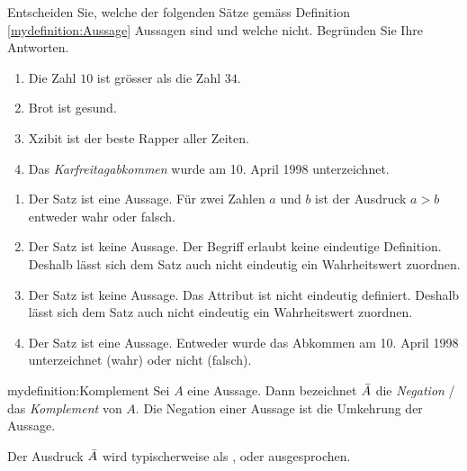 \clearpage
\begin{myexercise}%
	\noindent
	Entscheiden Sie, welche der folgenden Sätze gemäss Definition \cref{mydefinition:Aussage} Aussagen sind und welche nicht. Begründen Sie Ihre Antworten.
	\begin{enumerate}[label=(\alph*)]
		\item Die Zahl $10$ ist grösser als die Zahl $34$.
		\item Brot ist gesund.
		\item Xzibit ist der beste Rapper aller Zeiten.
		\item Das \textit{Karfreitagabkommen} wurde am 10. April 1998 unterzeichnet.
	\end{enumerate}
\end{myexercise}
\begin{myanswer}
	\noindent
	\begin{enumerate}[label=(\alph*)]
		\item Der Satz ist eine Aussage. Für zwei Zahlen $a$ und $b$ ist der Ausdruck $a > b$ entweder wahr oder falsch.
		\item Der Satz ist keine Aussage. Der Begriff  erlaubt keine eindeutige Definition. Deshalb lässt sich dem Satz auch nicht eindeutig ein Wahrheitswert zuordnen.
		\item Der Satz ist keine Aussage. Das Attribut  ist nicht eindeutig definiert. Deshalb lässt sich dem Satz auch nicht eindeutig ein Wahrheitswert zuordnen.
		\item Der Satz ist eine Aussage. Entweder wurde das Abkommen am 10. April 1998 unterzeichnet (wahr) oder nicht (falsch).
	\end{enumerate}
\end{myanswer}
\noindent
\begin{mydefinition}[Negation]{mydefinition:Komplement}
Sei $A$ eine Aussage. Dann bezeichnet $\Bar{A}$ die \textit{Negation} / das \textit{Komplement} von $A$. Die Negation einer Aussage ist die Umkehrung der Aussage.
\end{mydefinition}
Der Ausdruck $\Bar{A}$ wird typischerweise als ,  oder  ausgesprochen.

